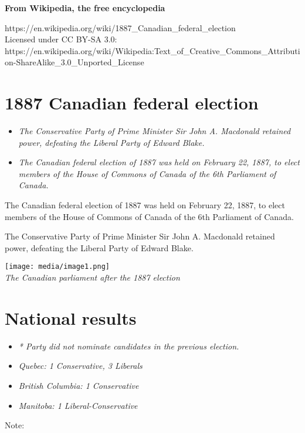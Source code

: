 \textbf{From Wikipedia, the free encyclopedia}

https://en.wikipedia.org/wiki/1887\_Canadian\_federal\_election\\
Licensed under CC BY-SA 3.0:\\
https://en.wikipedia.org/wiki/Wikipedia:Text\_of\_Creative\_Commons\_Attribution-ShareAlike\_3.0\_Unported\_License

\section{1887 Canadian federal
election}\label{canadian-federal-election}

\begin{itemize}
\item
  \emph{The Conservative Party of Prime Minister Sir John A. Macdonald
  retained power, defeating the Liberal Party of Edward Blake.}
\item
  \emph{The Canadian federal election of 1887 was held on February 22,
  1887, to elect members of the House of Commons of Canada of the 6th
  Parliament of Canada.}
\end{itemize}

The Canadian federal election of 1887 was held on February 22, 1887, to
elect members of the House of Commons of Canada of the 6th Parliament of
Canada.

The Conservative Party of Prime Minister Sir John A. Macdonald retained
power, defeating the Liberal Party of Edward Blake.

\texttt{[image: media/image1.png]}\\
\emph{The Canadian parliament after the 1887 election}

\section{National results}\label{national-results}

\begin{itemize}
\item
  \emph{* Party did not nominate candidates in the previous election.}
\item
  \emph{Quebec: 1 Conservative, 3 Liberals}
\item
  \emph{British Columbia: 1 Conservative}
\item
  \emph{Manitoba: 1 Liberal-Conservative}
\end{itemize}

Note:

